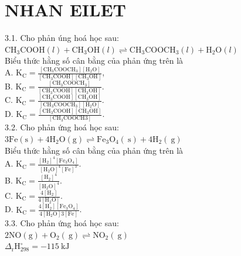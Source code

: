 \documentclass[10pt]{article}
\begin{document}
\section*{NHAN EILET}
3.1. Cho phản úng hoá học sau:\\
$\mathrm{CH}_{3} \mathrm{COOH}(l)+\mathrm{CH}_{3} \mathrm{OH}(l) \rightleftharpoons \mathrm{CH}_{3} \mathrm{COOCH}_{3}(l)+\mathrm{H}_{2} \mathrm{O}(l)$\\
Biểu thức hằng số cân bằng của phản ứng trên là\\
A. $\mathrm{K}_{\mathrm{C}}=\frac{\left[\mathrm{CH}_{3} \mathrm{COOCH}_{3}\right]\left[\mathrm{H}_{2} \mathrm{O}\right]}{\left[\mathrm{CH}_{3} \mathrm{COOH}\right]\left[\mathrm{CH}_{3} \mathrm{OH}\right]}$,\\
B. $\mathrm{K}_{\mathrm{C}}=\frac{\left[\mathrm{CH}_{3} \mathrm{COOCH}_{3}\right]}{\left[\mathrm{CH}_{3} \mathrm{COOH}\right]\left[\mathrm{CH}_{3} \mathrm{OH}\right]}$.\\
C. $\mathrm{K}_{\mathrm{C}}=\frac{\left[\mathrm{CH}_{3} \mathrm{COOH}\right]\left[\mathrm{CH}_{3} \mathrm{OH}\right]}{\left[\mathrm{CH}_{3} \mathrm{COOCH}_{3}\right]\left[\mathrm{H}_{2} \mathrm{O}\right]}$.\\
D. $\mathrm{K}_{\mathrm{C}}=\frac{\left[\mathrm{CH}_{3} \mathrm{COOH}\right]\left[\mathrm{CH}_{3} \mathrm{OH}\right]}{\left[\mathrm{CH}_{3} \mathrm{COOCH} 3\right]}$.\\
3.2. Cho phản ứng hoá học sau:\\
$3 \mathrm{Fe}(\mathrm{s})+4 \mathrm{H}_{2} \mathrm{O}(\mathrm{g}) \rightleftharpoons \mathrm{Fe}_{3} \mathrm{O}_{4}(\mathrm{~s})+4 \mathrm{H}_{2}(\mathrm{~g})$\\
Biểu thức hằng số cân bằng của phản ứng trên là\\
A. $\mathrm{K}_{\mathrm{C}}=\frac{\left[\mathrm{H}_{2}\right]^{4}\left[\mathrm{Fe}_{3} \mathrm{O}_{4}\right]}{\left[\mathrm{H}_{2} \mathrm{O}\right]^{4}[\mathrm{Fe}]^{3}}$.\\
B. $\mathrm{K}_{\mathrm{C}}=\frac{\left[\mathrm{H}_{2}\right]^{4}}{\left[\mathrm{H}_{2} \mathrm{O}\right]^{4}}$.\\
C. $\mathrm{K}_{\mathrm{C}}=\frac{4\left[\mathrm{H}_{2}\right]}{4\left[\mathrm{H}_{2} \mathrm{O}\right]}$.\\
D. $\mathrm{K}_{\mathrm{C}}=\frac{4\left[\mathrm{H}_{2}\right]\left[\mathrm{Fe}_{3} \mathrm{O}_{4}\right]}{4\left[\mathrm{H}_{2} \mathrm{O}\right] 3[\mathrm{Fe}]}$.\\
3.3. Cho phản ứng hoá học sau:\\
$2 \mathrm{NO}(\mathrm{g})+\mathrm{O}_{2}(\mathrm{~g}) \rightleftharpoons \mathrm{NO}_{2}(\mathrm{~g})$\\
$\Delta_{\mathrm{r}} \mathrm{H}_{298}^{\circ}=-115 \mathrm{~kJ}$
\end{document}
